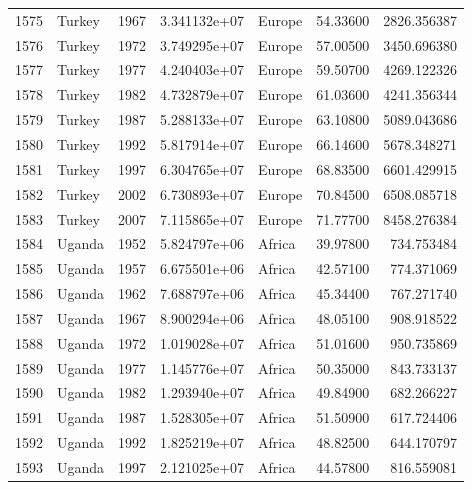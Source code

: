 \documentclass[
  letterpaper,
  DIV=11,
  numbers=noendperiod]{scrreprt}
\begin{document}
\begin{tabular}{llrrlrr}
1575 &                    Turkey &  1967 &  3.341132e+07 &    Europe &  54.33600 &    2826.356387 \\
1576 &                    Turkey &  1972 &  3.749295e+07 &    Europe &  57.00500 &    3450.696380 \\
1577 &                    Turkey &  1977 &  4.240403e+07 &    Europe &  59.50700 &    4269.122326 \\
1578 &                    Turkey &  1982 &  4.732879e+07 &    Europe &  61.03600 &    4241.356344 \\
1579 &                    Turkey &  1987 &  5.288133e+07 &    Europe &  63.10800 &    5089.043686 \\
1580 &                    Turkey &  1992 &  5.817914e+07 &    Europe &  66.14600 &    5678.348271 \\
1581 &                    Turkey &  1997 &  6.304765e+07 &    Europe &  68.83500 &    6601.429915 \\
1582 &                    Turkey &  2002 &  6.730893e+07 &    Europe &  70.84500 &    6508.085718 \\
1583 &                    Turkey &  2007 &  7.115865e+07 &    Europe &  71.77700 &    8458.276384 \\
1584 &                    Uganda &  1952 &  5.824797e+06 &    Africa &  39.97800 &     734.753484 \\
1585 &                    Uganda &  1957 &  6.675501e+06 &    Africa &  42.57100 &     774.371069 \\
1586 &                    Uganda &  1962 &  7.688797e+06 &    Africa &  45.34400 &     767.271740 \\
1587 &                    Uganda &  1967 &  8.900294e+06 &    Africa &  48.05100 &     908.918522 \\
1588 &                    Uganda &  1972 &  1.019028e+07 &    Africa &  51.01600 &     950.735869 \\
1589 &                    Uganda &  1977 &  1.145776e+07 &    Africa &  50.35000 &     843.733137 \\
1590 &                    Uganda &  1982 &  1.293940e+07 &    Africa &  49.84900 &     682.266227 \\
1591 &                    Uganda &  1987 &  1.528305e+07 &    Africa &  51.50900 &     617.724406 \\
1592 &                    Uganda &  1992 &  1.825219e+07 &    Africa &  48.82500 &     644.170797 \\
1593 &                    Uganda &  1997 &  2.121025e+07 &    Africa &  44.57800 &     816.559081 \\

\end{tabular}
\end{document}
